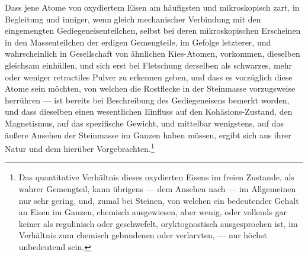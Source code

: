 \documentclass[a4paper, 11pt, oneside, german]{article}
\begin{document}
Dass jene Atome von oxydiertem Eisen am häufigsten und mikroskopisch zart, in Begleitung und inniger, wenn gleich mechanischer Verbindung mit den eingemengten Gediegeneisenteilchen, selbst bei deren mikroskopischen Erscheinen in den Massenteilchen der erdigen Gemengteile, im Gefolge letzterer, und wahrscheinlich in Gesellschaft von ähnlichen Kies-Atomen, vorkommen, dieselben gleichsam einhüllen, und sich erst bei Fletschung derselben als schwarzes, mehr oder weniger retractiles Pulver zu erkennen geben, und dass es vorzüglich diese Atome sein möchten, von welchen die Rostflecke in der Steinmasse vorzugsweise herrühren --- ist bereits bei Beschreibung des Gediegeneisens bemerkt worden, und dass dieselben einen wesentlichen Einfluss auf den Kohäsions-Zustand, den Magnetismus, auf das spezifische Gewicht, und mittelbar wenigstens, auf das äußere Ansehen der Steinmasse im Ganzen haben müssen, ergibt sich aus ihrer Natur und dem hierüber Vorgebrachten.\footnote{Das quantitative Verhältnis dieses oxydierten Eisens im freien Zustande, als wahrer Gemengteil, kann übrigens --- dem Ansehen nach --- im Allgemeinen nur sehr gering, und, zumal bei Steinen, von welchen ein bedeutender Gehalt an Eisen im Ganzen, chemisch ausgewiesen, aber wenig, oder vollends gar keiner als regulinisch oder geschwefelt, oryktognostisch ausgesprochen ist, im Verhältnis zum chemisch gebundenen oder verlarvten, --- nur höchst unbedeutend sein.}
\end{document}
